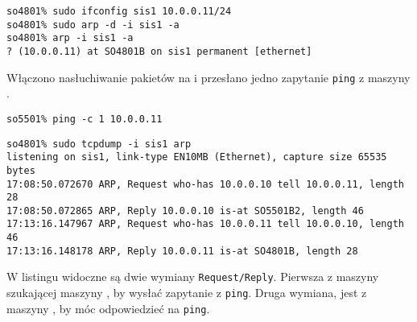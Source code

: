 \begin{lstlisting}
so4801% sudo ifconfig sis1 10.0.0.11/24
so4801% sudo arp -d -i sis1 -a
so4801% arp -i sis1 -a
? (10.0.0.11) at SO4801B on sis1 permanent [ethernet]
\end{lstlisting}

Włączono nasłuchiwanie pakietów \arp{} na \tjj{} i przesłano jedno zapytanie
\texttt{ping} z maszyny \tjz.

\begin{lstlisting}
so5501% ping -c 1 10.0.0.11
\end{lstlisting}

\begin{lstlisting}
so4801% sudo tcpdump -i sis1 arp
listening on sis1, link-type EN10MB (Ethernet), capture size 65535 bytes
17:08:50.072670 ARP, Request who-has 10.0.0.10 tell 10.0.0.11, length 28
17:08:50.072865 ARP, Reply 10.0.0.10 is-at SO5501B2, length 46
17:13:16.147967 ARP, Request who-has 10.0.0.11 tell 10.0.0.10, length 46
17:13:16.148178 ARP, Reply 10.0.0.11 is-at SO4801B, length 28
\end{lstlisting}

W listingu widoczne są dwie wymiany \texttt{Request/Reply}. Pierwsza z maszyny
\tjz{} szukającej maszyny \tjj{}, by wysłać zapytanie z \texttt{ping}. Druga
wymiana, jest z maszyny \tjj{}, by móc odpowiedzieć na \texttt{ping}.
